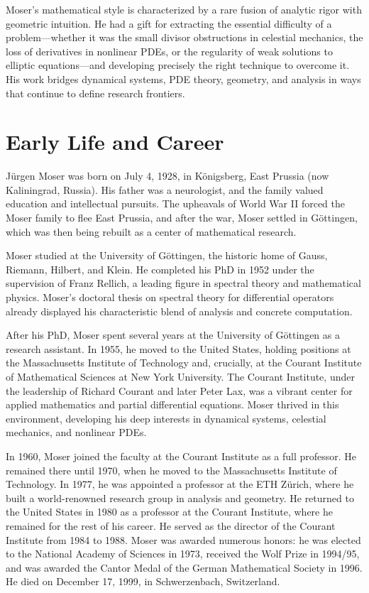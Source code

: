 Moser's mathematical style is characterized by a rare fusion of analytic rigor with geometric intuition. He had a gift for extracting the essential difficulty of a problem---whether it was the small divisor obstructions in celestial mechanics, the loss of derivatives in nonlinear PDEs, or the regularity of weak solutions to elliptic equations---and developing precisely the right technique to overcome it. His work bridges dynamical systems, PDE theory, geometry, and analysis in ways that continue to define research frontiers.

\section{Early Life and Career}

J\"{u}rgen Moser was born on July 4, 1928, in K\"{o}nigsberg, East Prussia (now Kaliningrad, Russia). His father was a neurologist, and the family valued education and intellectual pursuits. The upheavals of World War II forced the Moser family to flee East Prussia, and after the war, Moser settled in G\"{o}ttingen, which was then being rebuilt as a center of mathematical research.

Moser studied at the University of G\"{o}ttingen, the historic home of Gauss, Riemann, Hilbert, and Klein. He completed his PhD in 1952 under the supervision of Franz Rellich, a leading figure in spectral theory and mathematical physics. Moser's doctoral thesis on spectral theory for differential operators already displayed his characteristic blend of analysis and concrete computation.

After his PhD, Moser spent several years at the University of G\"{o}ttingen as a research assistant. In 1955, he moved to the United States, holding positions at the Massachusetts Institute of Technology and, crucially, at the Courant Institute of Mathematical Sciences at New York University. The Courant Institute, under the leadership of Richard Courant and later Peter Lax, was a vibrant center for applied mathematics and partial differential equations. Moser thrived in this environment, developing his deep interests in dynamical systems, celestial mechanics, and nonlinear PDEs.

In 1960, Moser joined the faculty at the Courant Institute as a full professor. He remained there until 1970, when he moved to the Massachusetts Institute of Technology. In 1977, he was appointed a professor at the ETH Z\"{u}rich, where he built a world-renowned research group in analysis and geometry. He returned to the United States in 1980 as a professor at the Courant Institute, where he remained for the rest of his career. He served as the director of the Courant Institute from 1984 to 1988. Moser was awarded numerous honors: he was elected to the National Academy of Sciences in 1973, received the Wolf Prize in 1994/95, and was awarded the Cantor Medal of the German Mathematical Society in 1996. He died on December 17, 1999, in Schwerzenbach, Switzerland.

